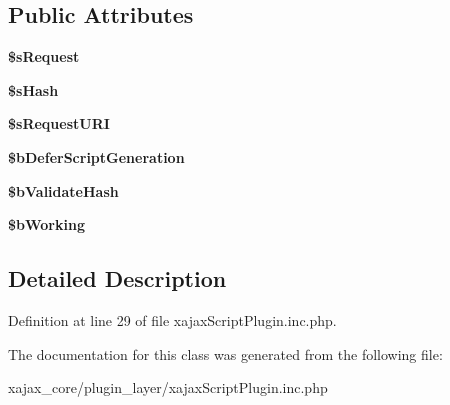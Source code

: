 \subsection*{Public Attributes}
\begin{DoxyCompactItemize}
\item 
\hypertarget{classxajaxScriptPlugin_aa4100db504256eaf0d3fd7f357f4437f}{
{\bfseries \$sRequest}}
\label{classxajaxScriptPlugin_aa4100db504256eaf0d3fd7f357f4437f}

\item 
\hypertarget{classxajaxScriptPlugin_a523435f13425ff4b55b020b13936f89f}{
{\bfseries \$sHash}}
\label{classxajaxScriptPlugin_a523435f13425ff4b55b020b13936f89f}

\item 
\hypertarget{classxajaxScriptPlugin_a7318c13d45c1fb960e3c7ac943f95981}{
{\bfseries \$sRequestURI}}
\label{classxajaxScriptPlugin_a7318c13d45c1fb960e3c7ac943f95981}

\item 
\hypertarget{classxajaxScriptPlugin_a4eb3bfc676dab4f53251cfd1bba970bc}{
{\bfseries \$bDeferScriptGeneration}}
\label{classxajaxScriptPlugin_a4eb3bfc676dab4f53251cfd1bba970bc}

\item 
\hypertarget{classxajaxScriptPlugin_a66f2ee8c1725069416e14a84fa1c0701}{
{\bfseries \$bValidateHash}}
\label{classxajaxScriptPlugin_a66f2ee8c1725069416e14a84fa1c0701}

\item 
\hypertarget{classxajaxScriptPlugin_a52c2b7b12c58e5c4570d00e4ac1c8e7d}{
{\bfseries \$bWorking}}
\label{classxajaxScriptPlugin_a52c2b7b12c58e5c4570d00e4ac1c8e7d}

\end{DoxyCompactItemize}


\subsection{Detailed Description}


Definition at line 29 of file xajaxScriptPlugin.inc.php.



The documentation for this class was generated from the following file:\begin{DoxyCompactItemize}
\item 
xajax\_\-core/plugin\_\-layer/xajaxScriptPlugin.inc.php\end{DoxyCompactItemize}

